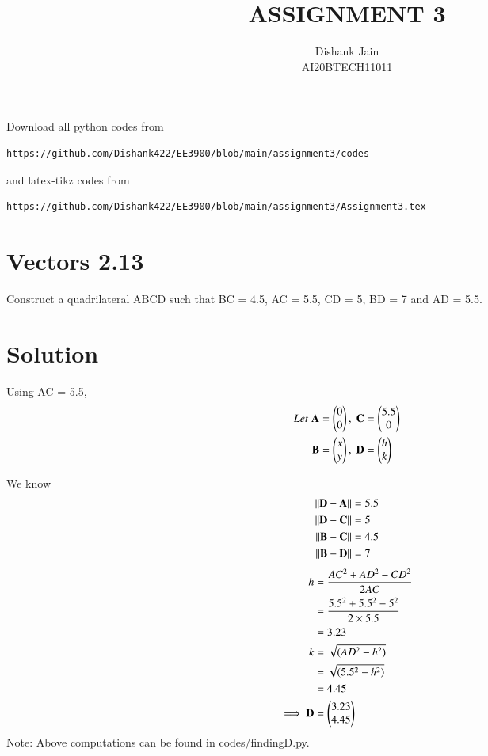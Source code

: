 \documentclass[journal,12pt,twocolumn]{IEEEtran}
\begin{document}
     \def\centbox#1{\makebox[0in]{#1}}
     \def\topbox#1{\raisebox{-\baselineskip}[0in][0in]{#1}}
     \def\midbox#1{\raisebox{-0.5\baselineskip}[0in][0in]{#1}}
\vspace{3cm}
\title{ASSIGNMENT 3}
\author{Dishank Jain \\ AI20BTECH11011}
\maketitle
\newpage
\bigskip
\renewcommand{\thefigure}{\theenumi}
\renewcommand{\thetable}{\theenumi}
Download all python codes from 
\begin{lstlisting}
https://github.com/Dishank422/EE3900/blob/main/assignment3/codes
\end{lstlisting}
%
and latex-tikz codes from 
%
\begin{lstlisting}
https://github.com/Dishank422/EE3900/blob/main/assignment3/Assignment3.tex
\end{lstlisting}
%
\section{Vectors 2.13}
Construct a quadrilateral ABCD such that BC = 4.5, AC = 5.5, CD = 5, BD = 7  and AD = 5.5.
\section{Solution}
Using AC = 5.5,
\begin{align}
    Let\; \mathbf{A} &= \begin{pmatrix}0\\0\end{pmatrix},\; \mathbf{C} = \begin{pmatrix}5.5\\0\end{pmatrix}\\
    \mathbf{B} &= \begin{pmatrix}x\\y\end{pmatrix},\; \mathbf{D} = \begin{pmatrix}h\\k\end{pmatrix}
\end{align}

We know 
\begin{align}
    \lVert\mathbf{D}-\mathbf{A}\rVert &= 5.5\label{DA}\\
    \lVert\mathbf{D}-\mathbf{C}\rVert &= 5\label{DC}\\
    \lVert\mathbf{B}-\mathbf{C}\rVert &= 4.5\label{BC}\\
    \lVert\mathbf{B}-\mathbf{D}\rVert &= 7\label{BD}
\end{align}
\begin{align}
    h &= \dfrac{AC^2+AD^2-CD^2}{2AC}\\
      &= \dfrac{5.5^2+5.5^2-5^2}{2\times 5.5}\\
      &= 3.23\\
    k &= \sqrt{(AD^2-h^2)}\\
      &= \sqrt{(5.5^2-h^2)}\\
      &= 4.45\\
    \implies \mathbf{D} &= \begin{pmatrix}3.23\\4.45\end{pmatrix}
\end{align}
Note: Above computations can be found in codes/finding\textunderscore D.py.
\end{document}

